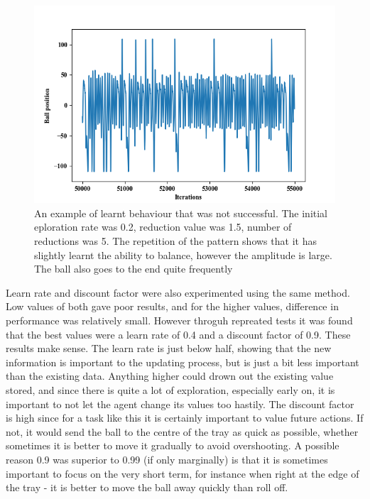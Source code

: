 \documentclass[12pt,a4paper]{article}
\begin{document}
\begin{figure}[H]
	\includegraphics{101_small}
	\caption{An example of learnt behaviour that was not successful. The initial eploration rate was 0.2, reduction value was 1.5, number of reductions was 5. The repetition of the pattern shows that it has slightly learnt the ability to balance, however the amplitude is large. The ball also goes to the end quite frequently}
\end{figure}

Learn rate and discount factor were also experimented using the same method. Low values of both gave poor results, and for the higher values, difference in performance was relatively small. However throguh repreated tests it was found that the best values were a learn rate of 0.4 and a discount factor of 0.9. These results make sense. The learn rate is just below half, showing that the new information is important to the updating process, but is just a bit less important than the existing data. Anything higher could drown out the existing value stored, and since there is quite a lot of exploration, especially early on, it is important to not let the agent change its values too hastily. The discount factor is high since for a task like this it is certainly important to value future actions. If not, it would send the ball to the centre of the tray as quick as possible, whether sometimes it is better to move it gradually to avoid overshooting. A possible reason 0.9 was superior to 0.99 (if only marginally) is that it is sometimes important to focus on the very short term, for instance when right at the edge of the tray - it is better to move the ball away quickly than roll off.
\end{document}
